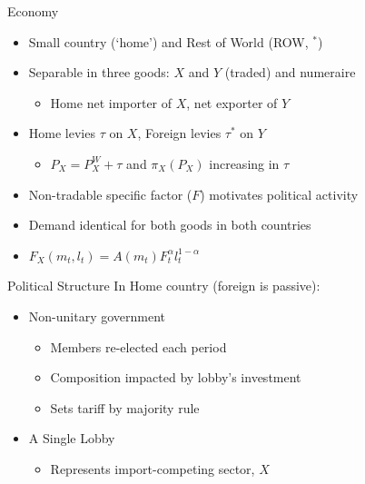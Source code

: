 \documentclass{beamer}
\begin{document}
\begin{frame}{Economy}
\begin{itemize}[<+->]
	\item Small country (`home') and Rest of World (ROW, ${}^*$)
	\item Separable in three goods: $X$ and $Y$ (traded) and numeraire
		\begin{itemize}[<+->]
			\item Home net importer of $X$, net exporter of $Y$
		\end{itemize}
	\item Home levies $\tau$ on $X$, Foreign levies $\tau^*$ on $Y$
		\begin{itemize}[<+->]
			\item $P_X=P_X^W + \tau$ and $\pi_X(P_X)$ increasing in $\tau$
		\end{itemize}
	\item Non-tradable specific factor ($F$) motivates political activity
	\item Demand identical for both goods in both countries
	\item $F_X(m_t,l_t) = A(m_t) F_t^{\alpha} l_t^{1 - \alpha}$
\end{itemize}
\end{frame}


\begin{frame}{Political Structure}
In Home country (foreign is passive):
\pause
\begin{itemize}[<+->]
	\item Non-unitary government
		\begin{itemize}[<+->]
			\item Members re-elected each period
			\item Composition impacted by lobby's investment
			\item Sets tariff by majority rule
		\end{itemize}
	\item A Single Lobby
		\begin{itemize}
			\item Represents import-competing sector, $X$
		\end{itemize}	
\end{itemize}

\end{frame}
\end{document}
